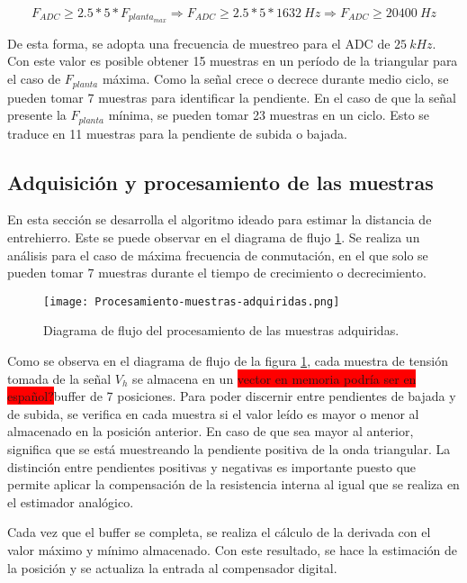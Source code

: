 \begin{equation} 
	F_{ADC} \geq 2.5 * 5 * F_{planta_{max}} \Rightarrow  F_{ADC} \geq 2.5 * 5 * 1632\:Hz \Rightarrow F_{ADC} \geq 20400\:Hz
\end{equation}


 De esta forma, se adopta una frecuencia de muestreo para el ADC de  $25\:kHz$. Con este valor es posible obtener 15 muestras en un período de la triangular para el caso de $F_{planta}$ máxima. Como la señal crece o decrece durante medio ciclo, se pueden tomar 7 muestras para identificar la pendiente. En el caso de que la señal presente la $F_{planta}$ mínima, se pueden tomar 23 muestras en un ciclo. Esto se traduce en 11 muestras para la pendiente de subida o bajada. 


\subsection{Adquisición y procesamiento de las muestras}

En esta sección se desarrolla el algoritmo ideado para estimar la distancia de entrehierro. Este se puede observar en el diagrama de flujo \ref{fig:procesamiento-muestras-adquiridas}. Se realiza un análisis para el caso de máxima frecuencia de conmutación, en el que solo se pueden tomar 7 muestras durante el tiempo de crecimiento o decrecimiento.


\begin{figure}[H]
	\centering
	\texttt{[image: Procesamiento-muestras-adquiridas.png]}
	\caption{ Diagrama de flujo del procesamiento de las muestras adquiridas.}
	\label{fig:procesamiento-muestras-adquiridas}
\end{figure}


Como se observa en el diagrama de flujo de la figura \ref{fig:procesamiento-muestras-adquiridas}, cada muestra de tensión tomada de la señal $V_h$ se almacena en un \colorbox{red}{vector en memoria podría ser en español?}buffer de 7 posiciones. Para poder discernir entre pendientes de bajada y de subida, se verifica en cada muestra si el valor leído es mayor o menor al almacenado en la posición anterior. En caso de que sea mayor al anterior, significa que se está muestreando la pendiente positiva de la onda triangular. La distinción entre pendientes positivas y negativas es importante puesto que permite aplicar la compensación de la resistencia interna al igual que se realiza en el estimador analógico. 

Cada vez que el buffer se completa, se realiza el cálculo de la derivada con el valor máximo y mínimo almacenado. Con este resultado, se hace la estimación de la posición y se actualiza la entrada al compensador digital.

